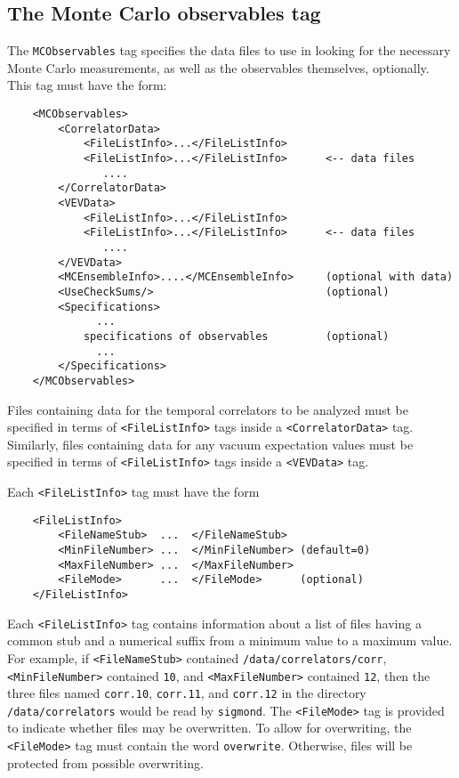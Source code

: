 \documentclass[12pt,notitlepage,letterpaper]{article}
\newcommand{\vb}{\texttt}
\begin{document}
\subsection{The Monte Carlo observables tag}
The \vb{MCObservables} tag specifies the data files to use in looking
for the necessary Monte Carlo measurements, as well as the observables
themselves, optionally.  This tag must have the form:
\begin{verbatim}
    <MCObservables>
        <CorrelatorData>
            <FileListInfo>...</FileListInfo>
            <FileListInfo>...</FileListInfo>      <-- data files
               .... 
        </CorrelatorData>
        <VEVData> 
            <FileListInfo>...</FileListInfo>
            <FileListInfo>...</FileListInfo>      <-- data files
               ....
        </VEVData>
        <MCEnsembleInfo>....</MCEnsembleInfo>     (optional with data)
        <UseCheckSums/>                           (optional)
        <Specifications>
              ... 
            specifications of observables         (optional)
              ...   
        </Specifications>
    </MCObservables>
\end{verbatim}

Files containing data for the temporal correlators to be analyzed
must be specified in terms of \vb{<FileListInfo>} tags inside a
\vb{<CorrelatorData>} tag.  Similarly, files containing data for
any vacuum expectation values must be specified in terms
of \vb{<FileListInfo>} tags inside a \vb{<VEVData>} tag.

Each \vb{<FileListInfo>} tag must have the form
\begin{verbatim}
    <FileListInfo>
        <FileNameStub>  ...  </FileNameStub>
        <MinFileNumber> ...  </MinFileNumber> (default=0)
        <MaxFileNumber> ...  </MaxFileNumber>
        <FileMode>      ...  </FileMode>      (optional)
    </FileListInfo>
\end{verbatim}
Each \vb{<FileListInfo>} tag contains information about a list of files
having a common stub and a numerical suffix from a minimum value to a 
maximum value. For example, if \vb{<FileNameStub>} contained
\vb{/data/correlators/corr}, \vb{<MinFileNumber>} contained
\vb{10}, and \vb{<MaxFileNumber>} contained \vb{12}, then
the three files named \vb{corr.10}, \vb{corr.11}, and \vb{corr.12}
in the directory \vb{/data/correlators} would be read by \vb{sigmond}.
The \vb{<FileMode>} tag is provided to indicate whether
files may be overwritten. To allow for overwriting, the
\vb{<FileMode>} tag must contain the word \vb{overwrite}. Otherwise,
files will be protected from possible overwriting.
\end{document}
